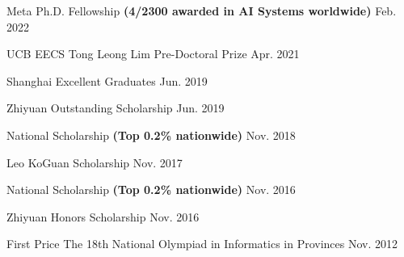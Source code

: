 
\begin{cvhonors}

\cvhonortop
{Meta Ph.D. Fellowship \textbf{(4/2300 awarded in AI Systems worldwide)}} %
{} %
{} %
{Feb. 2022} %

\cvhonortop
{UCB EECS Tong Leong Lim Pre-Doctoral Prize} %
{} %
{} %
{Apr. 2021} %

\cvhonortop
{Shanghai Excellent Graduates} %
{} %
{} %
{Jun. 2019} %

\cvhonortop
{Zhiyuan Outstanding Scholarship} %
{} %
{} %
{Jun. 2019} %

\cvhonortop
{National Scholarship \textbf{(Top 0.2\% nationwide)}} %
{} %
{} %
{Nov. 2018} %

\cvhonortop
{Leo KoGuan Scholarship} %
{} %
{} %
{Nov. 2017} %


\cvhonortop
{National Scholarship \textbf{(Top 0.2\% nationwide)}} %
{} %
{} %
{Nov. 2016} %

\cvhonortop
{Zhiyuan Honors Scholarship} %
{} %
{} %
{Nov. 2016} %

\cvhonor
{First Price} %
{The 18th National Olympiad in Informatics in Provinces} %
{} %
{Nov. 2012} %

\end{cvhonors}